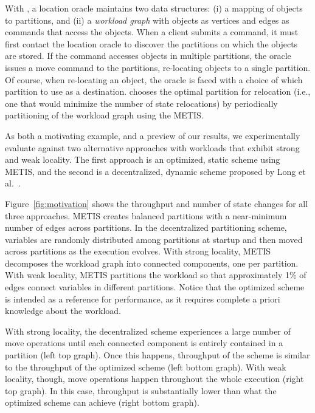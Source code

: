 With \dynastar, a location oracle maintains two data structures: (i) a
mapping of objects to partitions, and (ii) a \emph{workload graph}
with objects as vertices and edges as commands that access the
objects.  When a client submits a command, it must first contact the
location oracle to discover the partitions on which the objects are
stored.  If the command accesses objects in multiple partitions, the
oracle issues a move command to the partitions, re-locating objects to
a single partition. Of course, when re-locating an object, the oracle
is faced with a choice of which partition to use as a destination.
\dynastar chooses the optimal partition for relocation (i.e., one that
would minimize the number of state relocations) by periodically
partitioning of the workload graph using the METIS.


As both a motivating example, and a preview of our results, we
experimentally evaluate \dynastar against two alternative approaches
with workloads that exhibit strong and weak locality. The first
approach is an optimized, static scheme using METIS, and the second is
a decentralized, dynamic scheme proposed by Long et
al.~\cite{hoang2016}. 

Figure~\ref{fig:motivation} shows the throughput and number of state
changes for all three approaches. METIS creates balanced partitions with a near-minimum
number of edges across partitions.  In the decentralized partitioning
scheme, variables are randomly distributed among partitions at startup
and then moved across partitions as the execution evolves.  With
strong locality, METIS decomposes the workload graph into connected
components, one per partition.  With weak locality, METIS partitions
the workload so that approximately 1\% of edges connect variables in
different partitions.  Notice that the optimized scheme is intended as
a reference for performance, as it requires complete a priori
knowledge about the workload.

 With strong locality,
the decentralized scheme experiences a large number of move operations
until each connected component is entirely contained in a partition
(left top graph).  Once this happens, throughput of the scheme is
similar to the throughput of the optimized scheme (left bottom graph).
With weak locality, though, move operations happen throughout the
whole execution (right top graph).  In this case, throughput is
substantially lower than what the optimized scheme can achieve (right
bottom graph).




